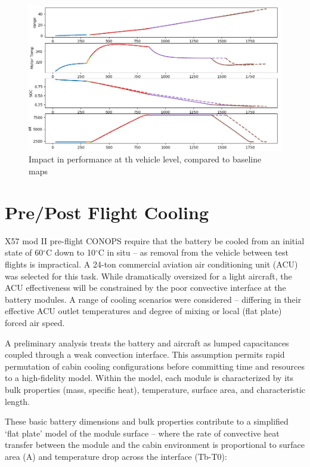 \documentclass[]{aiaa-tc}%
\begin{document}
\begin{figure}[!htb]
	\centering
	\includegraphics[width=1.0\textwidth]{figures/batt_mission.png}
	\caption{Impact in performance at th vehicle level, compared to baseline maps}
	\label{fig:Mission}
\end{figure}



\section{Pre/Post Flight Cooling}

X57 mod II pre-flight CONOPS require that the battery be cooled from an initial state of 60$^\circ$C down to 10$^\circ$C in situ – as removal from the vehicle between test flights is impractical.  A 24-ton commercial aviation air conditioning unit (ACU) was selected for this task.  While dramatically oversized for a light aircraft, the ACU effectiveness will be constrained by the poor convective interface at the battery modules. A range of cooling scenarios were considered – differing in their effective ACU outlet temperatures and degree of mixing or local (flat plate) forced air speed. 


A preliminary analysis treats the battery and aircraft as lumped capacitances coupled through a weak convection interface. This assumption permits rapid permutation of cabin cooling configurations before committing time and resources to a high-fidelity model.  Within the model, each module is characterized by its bulk properties (mass, specific heat), temperature, surface area, and characteristic length. 

These basic battery dimensions and bulk properties contribute to a simplified ‘flat plate’ model of the module surface – where the rate of convective heat transfer between the module and the cabin environment is proportional to surface area (A) and temperature drop across the interface (Tb-T0):
\end{document}

